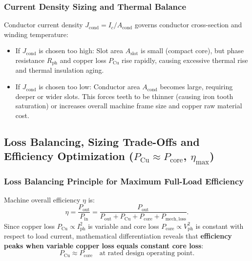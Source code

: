 \subsubsection{Current Density Sizing and Thermal Balance}
Conductor current density $J_{\mathrm{cond}} = I_c / A_{\mathrm{cond}}$ governs conductor cross-section and winding temperature:
\begin{itemize}
  \item If $J_{\mathrm{cond}}$ is chosen too high: Slot area $A_{\mathrm{slot}}$ is small (compact core), but phase resistance $R_{\mathrm{ph}}$ and copper loss $P_{\mathrm{Cu}}$ rise rapidly, causing excessive thermal rise and thermal insulation aging.
  \item If $J_{\mathrm{cond}}$ is chosen too low: Conductor area $A_{\mathrm{cond}}$ becomes large, requiring deeper or wider slots. This forces teeth to be thinner (causing iron tooth saturation) or increases overall machine frame size and copper raw material cost.
\end{itemize}

\subsection{Loss Balancing, Sizing Trade-Offs and Efficiency Optimization ($P_{\mathrm{Cu}} \approx P_{\mathrm{core}}$, $\eta_{\max}$)}

\subsubsection{Loss Balancing Principle for Maximum Full-Load Efficiency}
Machine overall efficiency $\eta$ is:
\[
\eta = \frac{P_{\mathrm{out}}}{P_{\mathrm{in}}} = \frac{P_{\mathrm{out}}}{P_{\mathrm{out}} + P_{\mathrm{Cu}} + P_{\mathrm{core}} + P_{\mathrm{mech,loss}}}.
\]
Since copper loss $P_{\mathrm{Cu}} \propto I_{\mathrm{ph}}^2$ is variable and core loss $P_{\mathrm{core}} \propto V_{\mathrm{ph}}^2$ is constant with respect to load current, mathematical differentiation reveals that \textbf{efficiency peaks when variable copper loss equals constant core loss}:
\[
P_{\mathrm{Cu}} \approx P_{\mathrm{core}}\quad\text{at rated design operating point}.
\]

